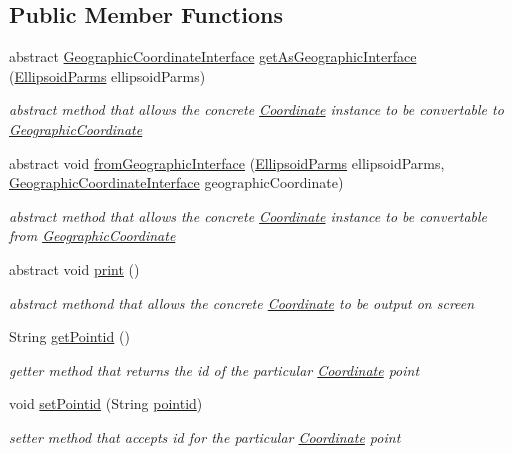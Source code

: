 \subsection*{Public Member Functions}
\begin{DoxyCompactItemize}
\item 
abstract \hyperlink{classcoordinates_1_1_geographic_coordinate_interface}{Geographic\+Coordinate\+Interface} \hyperlink{classcoordinates_1_1_coordinate_a97342479914743d999cef4b38f9124ed}{get\+As\+Geographic\+Interface} (\hyperlink{classparams_1_1_ellipsoid_parms}{Ellipsoid\+Parms} ellipsoid\+Parms)
\begin{DoxyCompactList}\small\item\em abstract method that allows the concrete \hyperlink{classcoordinates_1_1_coordinate}{Coordinate} instance to be convertable to \hyperlink{classcoordinates_1_1_geographic_coordinate}{Geographic\+Coordinate} \end{DoxyCompactList}\item 
abstract void \hyperlink{classcoordinates_1_1_coordinate_a7307326f53867082a66d1f96cfb1d7d0}{from\+Geographic\+Interface} (\hyperlink{classparams_1_1_ellipsoid_parms}{Ellipsoid\+Parms} ellipsoid\+Parms, \hyperlink{classcoordinates_1_1_geographic_coordinate_interface}{Geographic\+Coordinate\+Interface} geographic\+Coordinate)
\begin{DoxyCompactList}\small\item\em abstract method that allows the concrete \hyperlink{classcoordinates_1_1_coordinate}{Coordinate} instance to be convertable from \hyperlink{classcoordinates_1_1_geographic_coordinate}{Geographic\+Coordinate} \end{DoxyCompactList}\item 
abstract void \hyperlink{classcoordinates_1_1_coordinate_af2882da7117d4a312faf707df681042c}{print} ()
\begin{DoxyCompactList}\small\item\em abstract methond that allows the concrete \hyperlink{classcoordinates_1_1_coordinate}{Coordinate} to be output on screen \end{DoxyCompactList}\item 
String \hyperlink{classcoordinates_1_1_coordinate_ab0b1d8dc4fe371a2425e0cb505effafd}{get\+Pointid} ()
\begin{DoxyCompactList}\small\item\em getter method that returns the id of the particular \hyperlink{classcoordinates_1_1_coordinate}{Coordinate} point \end{DoxyCompactList}\item 
void \hyperlink{classcoordinates_1_1_coordinate_a14f00383b5a41df79220112a12ef1cbf}{set\+Pointid} (String \hyperlink{classcoordinates_1_1_coordinate_a871c4eb3e8771b3e59f26c8e573d6aa0}{pointid})
\begin{DoxyCompactList}\small\item\em setter method that accepts id for the particular \hyperlink{classcoordinates_1_1_coordinate}{Coordinate} point \end{DoxyCompactList}\end{DoxyCompactItemize}
